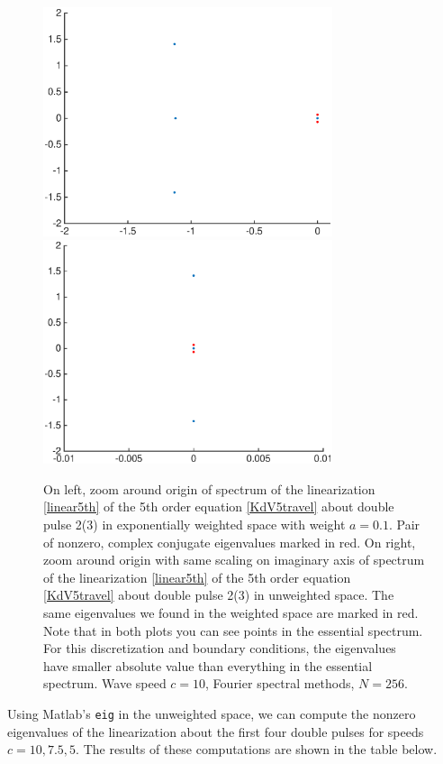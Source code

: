 \documentclass[12pt]{article}
\begin{document}
\begin{figure}[H]
	\includegraphics[width=8.5cm]{four10ud2_3redexpwt}
	\includegraphics[width=8.5cm]{four10ud2_3red}
	\caption{On left, zoom around origin of spectrum of the linearization \eqref{linear5th} of the 5th order equation \eqref{KdV5travel} about double pulse 2(3) in exponentially weighted space with weight $a = 0.1$. Pair of nonzero, complex conjugate eigenvalues marked in red. On right, zoom around origin with same scaling on imaginary axis of spectrum of the linearization \eqref{linear5th} of the 5th order equation \eqref{KdV5travel} about double pulse 2(3) in unweighted space. The same eigenvalues we found in the weighted space are marked in red. Note that in both plots you can see points in the essential spectrum. For this discretization and boundary conditions, the eigenvalues have smaller absolute value than everything in the essential spectrum. Wave speed $c = 10$, Fourier spectral methods, $N = 256$.}
\end{figure}

Using Matlab's \texttt{eig} in the unweighted space, we can compute the nonzero eigenvalues of the linearization about the first four double pulses for speeds $c = 10, 7.5, 5$. The results of these computations are shown in the table below.
\end{document}
